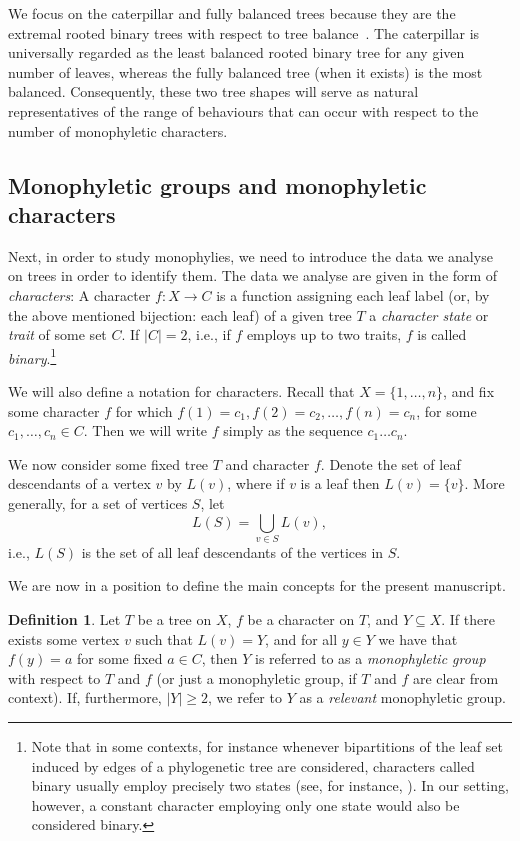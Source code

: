 \documentclass{amsart}
\theoremstyle{definition}
\newtheorem{definition}[theorem]{Definition}
\begin{document}
We focus on the caterpillar and fully balanced trees because they are the extremal rooted binary trees with respect to tree balance~\cite{fischer_tree_2023}. The caterpillar is universally regarded as the least balanced rooted binary tree for any given number of leaves, whereas the fully balanced tree (when it exists) is the most balanced. 
Consequently, these two tree shapes will serve as natural representatives of the range of behaviours that can occur with respect to the number of monophyletic characters.

\subsection*{Monophyletic groups and monophyletic characters} Next, in order to study monophylies, we need to introduce the data we analyse on trees in order to identify them. The data we analyse are given in the form of \emph{characters}: A character $f:X\rightarrow C$ is a function assigning each leaf label (or, by the above mentioned bijection: each leaf) of a given tree $T$ a \emph{character state} or \emph{trait} of some set $C$. If $|C|=2$, i.e., if $f$ employs up to two traits, $f$ is called \emph{binary}.\footnote{Note that in some contexts, for instance whenever bipartitions of the leaf set induced by edges of a phylogenetic tree are considered, characters called binary usually employ precisely two states (see, for instance, \cite{fischer2016,fischer2019}). In our setting, however, a constant character employing only one state would also be considered binary.} 

We will also define a notation for characters. Recall that $X = \{1,\dots, n\}$, and fix some character $f$ for which $f(1)=c_1,f(2)=c_2,\dots, f(n)=c_n$, for some $c_1,\dots,c_n \in C$. Then we will write $f$ simply as the sequence $c_1\dots c_n$.

We now consider some fixed tree $T$ and character $f$. Denote the set of leaf descendants of a vertex $v$ by $L(v)$, where if $v$ is a leaf then $L(v) =\{v\}$. More generally, for a set of vertices $S$, let 
\[ L(S) = \bigcup_{v \in S} L(v),\]
i.e., $L(S)$ is the set of all leaf descendants of the vertices in $S$.

We are now in a position to define the main concepts for the present manuscript.

\begin{definition}
    Let $T$ be a tree on $X$, $f$ be a character on $T$, and $Y \subseteq X$. If there exists some vertex $v$ such that $L(v)=Y$, and for all $y \in Y$ we have that $f(y)=a$ for some fixed $a \in C$, then $Y$ is referred to as a \emph{monophyletic group} with respect to $T$ and $f$ (or just a monophyletic group, if $T$ and $f$ are clear from context). If, furthermore, $|Y| \ge 2$, we refer to $Y$ as a \emph{relevant} monophyletic group.
\end{definition}
\end{document}
